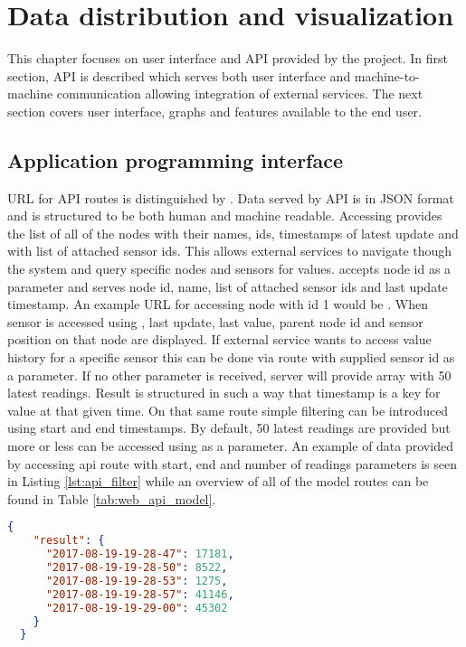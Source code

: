 \chapter{Data distribution and visualization}
\label{chap:display}

This chapter focuses on user interface and \ac{API} provided by the project. In first section, \ac{API} is described which serves both user interface and machine-to-machine communication allowing integration of external services. The next section covers user interface, graphs and features available to the end user.


\section{Application programming interface}

\ac{URL} for \ac{API} routes is distinguished by . Data served by \ac{API} is in \ac{JSON} format and is structured to be both human and machine readable. Accessing  provides the list of all of the nodes with their names, \ac{id}s, timestamps of latest update and with list of attached sensor \ac{id}s. This allows external services to navigate though the system and query specific nodes and sensors for values.  accepts node \ac{id} as a parameter and serves node id, name, list of attached sensor ids and last update timestamp. An example \ac{URL} for accessing node with id 1 would be . When sensor is accessed using , last update, last value, parent node id and sensor position on that node are displayed. If external service wants to access value history for a specific sensor this can be done via route  with supplied sensor id as a parameter. If no other parameter is received, server will provide array with 50 latest readings. Result is structured in such a way that timestamp is a key for value at that given time. On that same route simple filtering can be introduced using start and end timestamps. By default, 50 latest readings are provided but more or less can be accessed using  as a parameter. An example of data provided by accessing api route with start, end and number of readings parameters is seen in Listing \ref{lst:api_filter} while an overview of all of the model routes can be found in Table \ref{tab:web_api_model}.\\

\begin{lstlisting}[language=json,firstnumber=1,caption={API result for first 5 readings done in a set period of time},label={lst:api_filter}]
  {
    "result": {
      "2017-08-19-19-28-47": 17181, 
      "2017-08-19-19-28-50": 8522, 
      "2017-08-19-19-28-53": 1275, 
      "2017-08-19-19-28-57": 41146, 
      "2017-08-19-19-29-00": 45302
    }
  }
\end{lstlisting}

